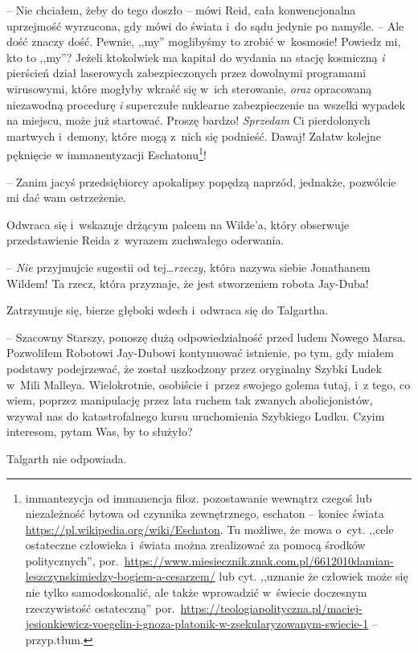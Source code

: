 \documentclass[oneside,polish,11pt,sfheadings]{mwbk}
\begin{document}
-- Nie chciałem, żeby do tego doszło -- mówi Reid, cała konwencjonalna
uprzejmość wyrzucona, gdy mówi do świata i~do sądu jedynie po namyśle. -- Ale dość znaczy dość. Pewnie, ,,my'' moglibyśmy to zrobić w~kosmosie!
Powiedz mi, kto to ,,my''? Jeżeli ktokolwiek ma kapitał do wydania na
stację kosmiczną \emph{i} pierścień dział laserowych zabezpieczonych
przez dowolnymi programami wirusowymi, które mogłyby wkraść się w~ich
sterowanie, \emph{oraz} opracowaną niezawodną procedurę \emph{i}
superczułe nuklearne zabezpieczenie na wszelki wypadek na miejscu, może
już startować. Proszę bardzo! \emph{Sprzedam} Ci pierdolonych martwych i~demony, które mogą z~nich się podnieść. Dawaj! Załatw kolejne pęknięcie
w immanentyzacji Eschatonu\footnote{immantezycja od immanencja filoz.
pozostawanie wewnątrz czegoś lub niezależność bytowa od czynnika
zewnętrznego, eschaton -- koniec świata
\url{https://pl.wikipedia.org/wiki/Eschaton}. Tu możliwe, że mowa o~cyt.
,,cele ostateczne człowieka i~świata można zrealizować za pomocą środków
politycznych'',
por.~\url{https://www.miesiecznik.znak.com.pl/6612010damian-leszczynskimiedzy-bogiem-a-cesarzem/}
lub cyt. ,,uznanie że człowiek może się nie tylko samodoskonalić, ale
także wprowadzić w~świecie doczesnym rzeczywistość ostateczną''
por.~\url{https://teologiapolityczna.pl/maciej-jesionkiewicz-voegelin-i-gnoza-platonik-w-zsekularyzowanym-swiecie-1}
 -- przyp.tłum.}!

-- Zanim jacyś przedsiębiorcy apokalipsy popędzą naprzód, jednakże,
pozwólcie mi dać wam ostrzeżenie.

Odwraca się i~wskazuje drżącym palcem na Wilde'a, który obserwuje
przedstawienie Reida z~wyrazem zuchwałego oderwania.

-- \emph{Nie} przyjmujcie sugestii od tej\ldots \emph{rzeczy}, która nazywa
siebie Jonathanem Wildem! Ta rzecz, która przyznaje, że jest stworzeniem
robota Jay-Duba!

Zatrzymuje się, bierze głęboki wdech i~odwraca się do Talgartha. 

-- Szacowny Starszy, ponoszę dużą odpowiedzialność przed ludem Nowego
Marsa. Pozwoliłem Robotowi Jay-Dubowi kontynuować istnienie, po tym, gdy
miałem podstawy podejrzewać, że został uszkodzony przez oryginalny
Szybki Ludek w~Mili Malleya. Wielokrotnie, osobiście i~przez swojego
golema tutaj, i~z tego, co wiem, poprzez manipulację przez lata ruchem
tak zwanych abolicjonistów, wzywał nas do katastrofalnego kursu
uruchomienia Szybkiego Ludku. Czyim interesom, pytam Was, by to służyło?

Talgarth nie odpowiada.
\end{document}

